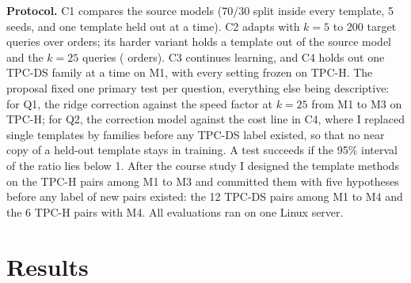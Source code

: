 \documentclass{article}
\begin{document}
\textbf{Protocol.} C1 compares the source models (70/30 split inside every template, 5 seeds, and one template held out at a time). C2 adapts with $k=5$ to 200 target queries over \EvalOrders{} orders; its harder variant holds a template out of the source model and the $k=25$ queries (\EvalHardOrders{} orders). C3 continues learning, and C4 holds out one TPC-DS family at a time on M1, with every setting frozen on \mbox{TPC-H}. The proposal fixed one primary test per question, everything else being descriptive: for Q1, the ridge correction against the speed factor at $k=25$ from M1 to M3 on TPC-H; for Q2, the correction model against the cost line in C4, where I replaced single templates by families before any TPC-DS label existed, so that no near copy of a held-out template stays in training. A test succeeds if the 95\% interval of the ratio lies below 1. After the course study I designed the template methods on the TPC-H pairs among M1 to M3 and committed them with five hypotheses before any label of \PHPairs{} new pairs existed: the 12 TPC-DS pairs among M1 to M4 and the 6 TPC-H pairs with M4. All evaluations ran on one Linux server.

\section{Results}
\label{sec:results}
\end{document}
